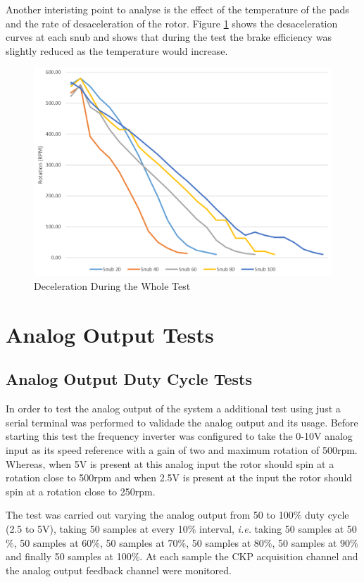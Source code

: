 		Another interisting point to analyse is the effect of the temperature of the pads and the rate of desaceleration of the rotor. Figure \ref{fig:snubs-rotation} shows the desaceleration curves at each snub and shows that during the test the brake efficiency was slightly reduced as the temperature would increase.

		\begin{figure}[htbp]
				\centering
				\includegraphics[width=.8\textwidth]{figuras/fig-snubs-rotation}
				\caption{Deceleration During the Whole Test}
				\label{fig:snubs-rotation}
		\end{figure}

\section{Analog Output Tests}\label{sec:analog-output-test}
	
	\subsection{Analog Output Duty Cycle Tests}\label{sec:duty-cycle-test}

		In order to test the analog output of the system a additional test using just a serial terminal was performed to validade the analog output and its usage. Before starting this test the frequency inverter was configured to take the 0-10V analog input as its speed reference with a gain of two and maximum rotation of 500rpm. Whereas, when 5V is present at this analog input the rotor should spin at a rotation close to 500rpm and when 2.5V is present at the input the rotor should spin at a rotation close to 250rpm.
		\par
		The test was carried out varying the analog output from 50 to 100$\%$ duty cycle (2.5 to 5V), taking 50 samples at every 10$\%$ interval, \textit{i.e.} taking 50 samples at 50$\%$, 50 samples at 60$\%$, 50 samples at 70$\%$, 50 samples at 80$\%$, 50 samples at 90$\%$ and finally 50 samples at 100$\%$. At each sample the CKP acquisition channel and the analog output feedback channel were monitored.
	
